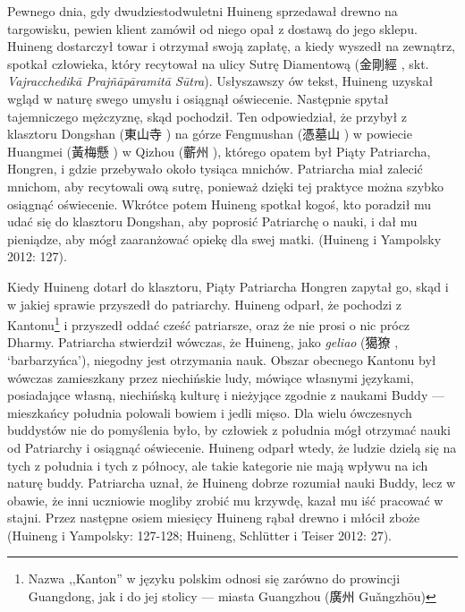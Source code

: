 Pewnego dnia, gdy dwudziestodwuletni Huineng sprzedawał drewno na targowisku, pewien klient zamówił od niego opał z dostawą do jego sklepu. Huineng dostarczył towar i otrzymał swoją zapłatę, a kiedy wyszedł na zewnątrz, spotkał człowieka, który recytował na ulicy Sutrę Diamentową (金剛經 , skt. \textit{Vajracchedikā Prajñāpāramitā Sūtra}). Usłyszawszy ów tekst, Huineng uzyskał wgląd w naturę swego umysłu i osiągnął oświecenie. Następnie spytał tajemniczego mężczyznę, skąd pochodził. Ten odpowiedział, że przybył z klasztoru Dongshan (東山寺 ) na górze Fengmushan (憑墓山 ) w powiecie Huangmei (黃梅懸 ) w Qizhou (蘄州 ), którego opatem był Piąty Patriarcha, Hongren, i gdzie przebywało około tysiąca mnichów. Patriarcha miał zalecić mnichom, aby recytowali ową sutrę, ponieważ dzięki tej praktyce można szybko osiągnąć oświecenie. Wkrótce potem Huineng spotkał kogoś, kto poradził mu udać się do klasztoru Dongshan, aby poprosić Patriarchę o nauki, i dał mu pieniądze, aby mógł zaaranżować opiekę dla swej matki. (Huineng i Yampolsky 2012: 127).

Kiedy Huineng dotarł do klasztoru, Piąty Patriarcha Hongren zapytał go, skąd i w jakiej sprawie przyszedł do patriarchy. Huineng odparł, że pochodzi z Kantonu\footnote{Nazwa ,,Kanton'' w języku polskim odnosi się zarówno do prowincji Guangdong, jak i do jej stolicy --- miasta Guangzhou (廣州 Guǎngzhōu)} i przyszedł oddać cześć patriarsze, oraz że nie prosi o nic prócz Dharmy. Patriarcha stwierdził wówczas, że Huineng, jako \textit{geliao} (獦獠 , `barbarzyńca'), niegodny jest otrzymania nauk. Obszar obecnego Kantonu był wówczas zamieszkany przez niechińskie ludy, mówiące własnymi językami, posiadające własną, niechińską kulturę i nieżyjące zgodnie z naukami Buddy --- mieszkańcy południa polowali bowiem i jedli mięso. Dla wielu ówczesnych buddystów nie do pomyślenia było, by człowiek z południa mógł otrzymać nauki od Patriarchy i osiągnąć oświecenie. Huineng odparł wtedy, że ludzie dzielą się na tych z południa i tych z północy, ale takie kategorie nie mają wpływu na ich naturę buddy. Patriarcha uznał, że Huineng dobrze rozumiał nauki Buddy, lecz w obawie, że inni uczniowie mogliby zrobić mu krzywdę, kazał mu iść pracować w stajni. Przez następne osiem miesięcy Huineng rąbał drewno i młócił zboże (Huineng i Yampolsky: 127-128; Huineng, Schlütter i Teiser 2012: 27).

